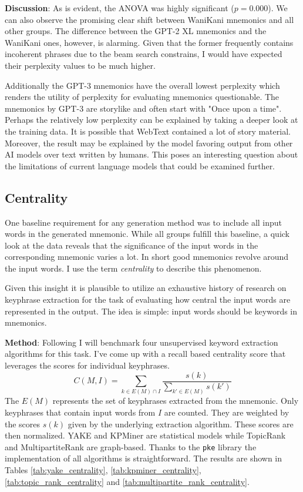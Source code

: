 \textbf{Discussion}: As is evident, the ANOVA was highly significant ($p = 0.000$). We can also observe the promising clear shift between WaniKani mnemonics and all other groups. The difference between the GPT-2 XL mnemonics and the WaniKani ones, however, is alarming. Given that the former frequently contains incoherent phrases due to the beam search constrains, I would have expected their perplexity values to be much higher.

Additionally the GPT-3 mnemonics have the overall lowest perplexity which renders the utility of perplexity for evaluating mnemonics questionable. The mnemonics by GPT-3 are storylike and often start with "Once upon a time". Perhaps the relatively low perplexity can be explained by taking a deeper look at the training data. It is possible that WebText contained a lot of story material. Moreover, the result may be explained by the model favoring output from other AI models over text written by humans. This poses an interesting question about the limitations of current language models that could be examined further. 
\subsection{Centrality}
One baseline requirement for any generation method was to include all input words in the generated mnemonic. While all groups fulfill this baseline, a quick look at the data reveals that the significance of the input words in the corresponding mnemonic varies a lot. In short good mnemonics revolve around the input words. I use the term \emph{centrality} to describe this phenomenon.

Given this insight it is plausible to utilize an exhaustive history of research on keyphrase extraction for the task of evaluating how central the input words are represented in the output. The idea is simple: input words should be keywords in mnemonics.

\textbf{Method}: Following I will benchmark four unsupervised keyword extraction algorithms for this task. I've come up with a recall based centrality score that leverages the scores for individual keyphrases.
\begin{equation}
    C(M, I) = \sum_{k \in E(M) \cap I} \frac{s(k)}{\sum_{k' \in E(M)} s(k')}
\end{equation}
The $E(M)$ represents the set of keyphrases extracted from the mnemonic. Only keyphrases that contain input words from $I$ are counted. They are weighted by the scores $s(k)$ given by the underlying extraction algorithm. These scores are then normalized.
YAKE and KPMiner are statistical models while TopicRank and MultipartiteRank are graph-based. Thanks to the \texttt{pke} \cite{pke} library the implementation of all algorithms is straightforward. The results are shown in Tables \ref{tab:yake_centrality}, \ref{tab:kpminer_centrality}, \ref{tab:topic_rank_centrality} and \ref{tab:multipartite_rank_centrality}.

